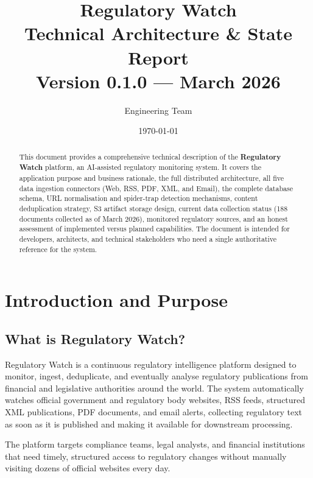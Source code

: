 \documentclass[12pt,a4paper]{article}
\title{%
  {\color{primaryblue}\Huge\bfseries Regulatory Watch}\\[0.5em]
  {\color{accentblue}\Large Technical Architecture \& State Report}\\[0.3em]
  {\color{darkgray}\normalsize Version 0.1.0 --- March 2026}
}
\author{Engineering Team}
\date{\today}
\begin{document}
\maketitle
\thispagestyle{empty}

\vspace{1cm}

\begin{abstract}
\noindent
This document provides a comprehensive technical description of the \textbf{Regulatory Watch} platform, an AI-assisted regulatory monitoring system. It covers the application purpose and business rationale, the full distributed architecture, all five data ingestion connectors (Web, RSS, PDF, XML, and Email), the complete database schema, URL normalisation and spider-trap detection mechanisms, content deduplication strategy, S3 artifact storage design, current data collection status (188 documents collected as of March 2026), monitored regulatory sources, and an honest assessment of implemented versus planned capabilities. The document is intended for developers, architects, and technical stakeholders who need a single authoritative reference for the system.
\end{abstract}

\vspace{1cm}
\tableofcontents
\clearpage

\section{Introduction and Purpose}

\subsection{What is Regulatory Watch?}

Regulatory Watch is a continuous regulatory intelligence platform designed to monitor, ingest, deduplicate, and eventually analyse regulatory publications from financial and legislative authorities around the world. The system automatically watches official government and regulatory body websites, RSS feeds, structured XML publications, PDF documents, and email alerts, collecting regulatory text as soon as it is published and making it available for downstream processing.

The platform targets compliance teams, legal analysts, and financial institutions that need timely, structured access to regulatory changes without manually visiting dozens of official websites every day.
\end{document}

